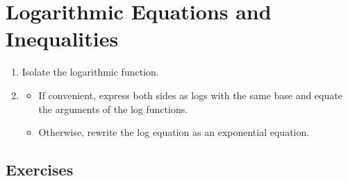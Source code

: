 \section{Logarithmic Equations and Inequalities}

\begin{procedure}
    \leavevmode
    \begin{enumerate}
        \item Isolate the logarithmic function.
        \item \begin{itemize}[label=\alph*]
                  \item If convenient, express both sides as logs with the same base and equate the arguments of the log functions.
                  \item Otherwise, rewrite the log equation as an exponential equation.
              \end{itemize}
    \end{enumerate}
\end{procedure}

\subsection{Exercises}
